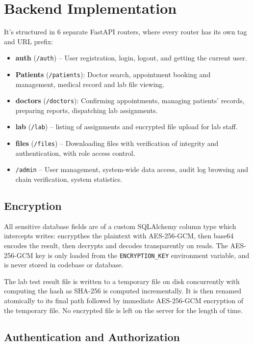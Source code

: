 \documentclass[a4paper,12pt]{report}
\begin{document}
\section{Backend Implementation}

It's structured in 6 separate FastAPI routers, where every router has its own tag and URL prefix:

\begin{itemize}
    \item \textbf{auth} (\texttt{/auth}) -- User registration, login, logout, and getting the current user.
    \item \textbf{Patients} (\texttt{/patients}): Doctor search, appointment booking and management, medical record and lab file viewing.
    \item \textbf{doctors} (\texttt{/doctors}): Confirming appointments, managing patients' records, preparing reports, dispatching lab assignments.
    \item \textbf{lab} (\texttt{/lab}) -- listing of assignments and encrypted file upload for lab staff.
    \item \textbf{files} (\texttt{/files}) -- Downloading files with verification of integrity and authentication, with role access control.
    \item \texttt{/admin} -- User management, system-wide data access, audit log browsing and chain verification, system statistics.
\end{itemize}

\subsection{Encryption}

All sensitive database fields are of a custom SQLAlchemy column type which intercepts writes: encrypthes the plaintext with AES-256-GCM, then base64 encodes the result, then decrypts and decodes transparently on reads. The AES-256-GCM key is only loaded from the \texttt{ENCRYPTION\_KEY} environment variable, and is never stored in codebase or database.

The lab test result file is written to a temporary file on disk concurrently with computing the hash as SHA-256 is computed incrementally. It is then renamed atomically to its final path followed by immediate AES-256-GCM encryption of the temporary file. No encrypted file is left on the server for the length of time.

\subsection{Authentication and Authorization}
\end{document}
